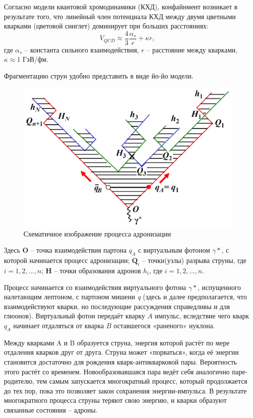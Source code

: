\documentclass{extarticle}
\begin{document}
Согласно модели квантовой хромодинамики (КХД), конфайнмент возникает в результате того, что линейный член потенциала КХД между двумя цветными кварками (цветовой синглет) доминирует при больших расстояниях:
\begin{equation}
	V_{QCD}\approx \frac{4}{3} \frac{\alpha_s}{r} + \kappa r,
\end{equation}
где $\alpha_s$ -- константа сильного взаимодействия, $r$ -- расстояние между кварками, $\kappa \approx 1$ ГэВ/фм. 


Фрагментацию струн удобно представить в виде йо-йо модели. 

\begin{figure}[ht]
    \centering
    \includegraphics[width = 0.8\linewidth]{fragmentation.png}
    \caption{Схематичное изображение процесса адронизации \cite{LUND}}
    \label{fig:hadronization}
\end{figure} 

Здесь \textbf{O} – точка взаимодействия партона $q_A$ с виртуальным фотоном $\gamma*$, с которой начинается процесс адронизации; $\textbf{Q}_i$ – точки(узлы) разрыва струны, где $i = 1, 2, \dots, n$; \textbf{H} -- точки образования адронов $h_i$, где $i = 1, 2, \dots, n$.

Процесс начинается со взаимодействия виртуального фотона $\gamma*$, испущенного налетающим лептоном, с партоном мишени \textit{q} (здесь и далее предполагается, что взаимодействуют кварки, но последующие рассуждения справедливы и для глюонов). Виртуальный фотон передаёт кварку $A$ импульс, вследствие чего кварк $q_A$ начинает отдаляться от кварка $B$ оставшегося «раненого» нуклона. 

Между кварками A и B образуется струна, энергия которой растёт по мере отдаления кварков друг от друга. Струна может «порваться», когда её энергии становится достаточно для рождения кварк-антикварковой пары. Вероятность этого растёт со временем. Новообразовавшаяся пара ведёт себя аналогично паре-родителю, тем самым запускается многократный процесс, который продолжается до тех пор, пока это позволяет закон сохранения энергии-импульса. В результате многократного процесса струны теряют свою энергию, и кварки образуют связанные состояния – адроны. 
\end{document}
